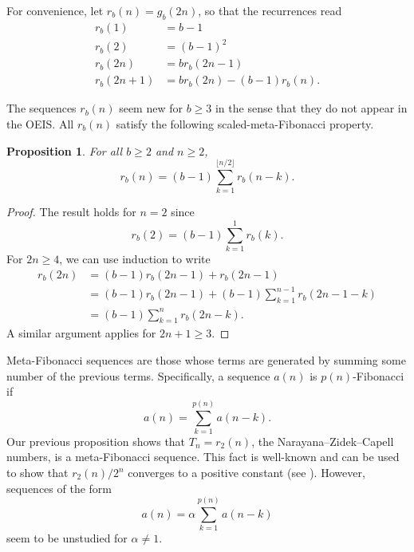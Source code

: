\documentclass[12pt]{amsart}
\newtheorem{proposition}{Proposition}
\theoremstyle{definition}
\begin{document}
For convenience, let $r_b(n) = g_b(2n)$, so that the recurrences read
\begin{align*}
    r_b(1) &= b - 1 \\
    r_b(2) &= (b - 1)^2 \\
    r_b(2n) &= b r_b(2n - 1) \\
    r_b(2n + 1) &= b r_b(2n) - (b - 1) r_b(n).
\end{align*}

The sequences $r_b(n)$ seem new for $b \geq 3$ in the sense that they do not
appear in the OEIS. All $r_b(n)$ satisfy the following scaled-meta-Fibonacci
property.

\begin{proposition}
    For all $b \geq 2$ and $n \geq 2$,
    \begin{equation*}
        r_b(n) = (b - 1) \sum_{k = 1}^{\lfloor n / 2 \rfloor} r_b(n - k).
    \end{equation*}
\end{proposition}

\begin{proof}
    The result holds for $n = 2$ since
    \begin{equation*}
        r_b(2) = (b - 1) \sum_{k = 1}^1 r_b(k).
    \end{equation*}
    For $2n \geq 4$, we can use induction to write
    \begin{align*}
        r_b(2n) &= (b - 1) r_b(2n - 1) + r_b(2n - 1) \\
                &= (b - 1) r_b(2n - 1) + (b - 1) \sum_{k = 1}^{n - 1} r_b(2n - 1 - k) \\
                &= (b - 1) \sum_{k = 1}^n r_b(2n - k).
    \end{align*}
    A similar argument applies for $2n + 1 \geq 3$.
\end{proof}

Meta-Fibonacci sequences are those whose terms are generated by summing some
number of the previous terms. Specifically, a sequence $a(n)$ is
$p(n)$-Fibonacci if
\begin{equation*}
    a(n) = \sum_{k = 1}^{p(n)} a(n - k).
\end{equation*}
Our previous proposition shows that $T_n = r_2(n)$, the Narayana--Zidek--Capell
numbers, is a meta-Fibonacci sequence. This fact is well-known and can be used
to show that $r_2(n) / 2^n$ converges to a positive constant (see
\cite{emerson2006family}). However, sequences of the form
\begin{equation*}
    a(n) = \alpha \sum_{k = 1}^{p(n)} a(n - k)
\end{equation*}
seem to be unstudied for $\alpha \neq 1$.
\end{document}
